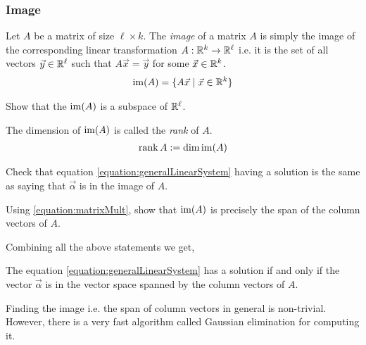 \subsubsection{Image}
\begin{definition}
  Let $A$ be a matrix of size $\ell \times k$.
  The \emph{image} of a matrix $A$ is simply the image of the corresponding linear transformation $A:\mathbb{R}^k \rightarrow \mathbb{R}^\ell$ i.e. it is the set of all vectors $\vec{y} \in \mathbb{R}^\ell$ such that $A \vec{x} = \vec{y} $ for some $\vec{x} \in \mathbb{R}^k$.
  \begin{align*}
    \operatorname{im}(A) = \{ A \vec{x} \mid \vec{x} \in \mathbb{R}^k \}
  \end{align*}
\end{definition}

\begin{qbox}
  Show that the $\operatorname{im}(A)$ is a subspace of $\mathbb{R}^\ell$.
\end{qbox}

\begin{definition}
  The dimension of $\operatorname{im}(A)$ is called the \emph{rank} of $A$.
  \begin{align*}
    \operatorname{rank} A := \dim \operatorname{im} (A)
  \end{align*}
\end{definition}

\begin{qbox}
  Check that equation \eqref{equation:generalLinearSystem} having a solution is the same as saying that $\vec{\alpha}$ is in the image of $A$.
\end{qbox}

\begin{qbox}
  Using \eqref{equation:matrixMult}, show that $\operatorname{im}(A)$ is precisely the span of the column vectors of $A$.
\end{qbox}

Combining all the above statements we get,
\begin{theorem}
  The equation \eqref{equation:generalLinearSystem} has a solution if and only if the vector $\vec{\alpha}$ is in the vector space spanned by the column vectors of $A$.
\end{theorem}

Finding the image i.e. the span of column vectors in general is non-trivial. However, there is a very fast algorithm called Gaussian elimination for computing it.

